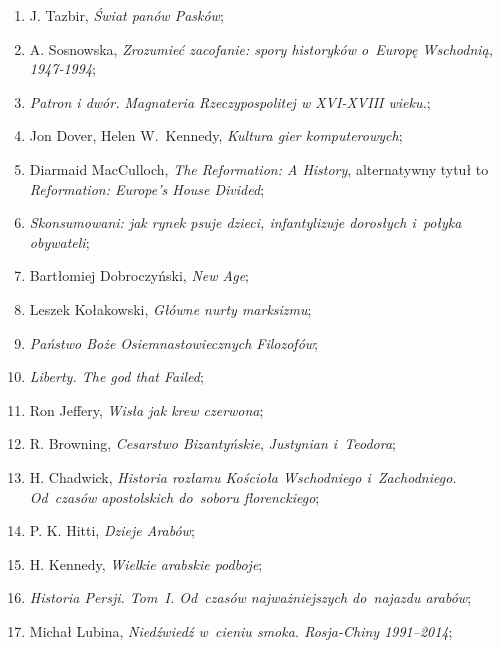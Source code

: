 \documentclass[a4paper,11pt]{article}
\begin{document}
\begin{enumerate}
\item J. Tazbir, \textit{Świat panów Pasków};

\item A. Sosnowska, \textit{Zrozumieć zacofanie: spory historyków
    o~Europę Wschodnią, 1947-1994};

\item \textit{Patron i dwór. Magnateria Rzeczypospolitej w XVI-XVIII
    wieku.};

\item Jon Dover, Helen W.~Kennedy, \textit{Kultura gier komputerowych};

\item Diarmaid MacCulloch, \textit{The Reformation: A History},
  alternatywny tytuł to \textit{Reformation: Europe's House Divided};

\item \textit{Skonsumowani: jak rynek psuje dzieci, infantylizuje
    dorosłych i~połyka obywateli};

\item Bartłomiej Dobroczyński, \textit{New Age};

\item Leszek Kołakowski, \textit{Główne nurty marksizmu};

\item \textit{Państwo Boże Osiemnastowiecznych Filozofów};

\item \textit{Liberty. The god that Failed};

\item Ron Jeffery, \textit{Wisła jak krew czerwona};

\item R. Browning, \textit{Cesarstwo Bizantyńskie}, \textit{Justynian
    i~Teodora};

\item H. Chadwick, \textit{Historia rozłamu Kościoła Wschodniego
    i~Zachodniego. Od~czasów apostolskich do~soboru florenckiego};

\item P. K. Hitti, \textit{Dzieje Arabów};

\item H. Kennedy, \textit{Wielkie arabskie podboje};

\item \textit{Historia Persji. Tom~I. Od~czasów najważniejszych
    do~najazdu arabów};

\item Michał Lubina, \textit{Niedźwiedź w~cieniu smoka. Rosja-Chiny
    1991--2014};


\end{enumerate}
\end{document}
